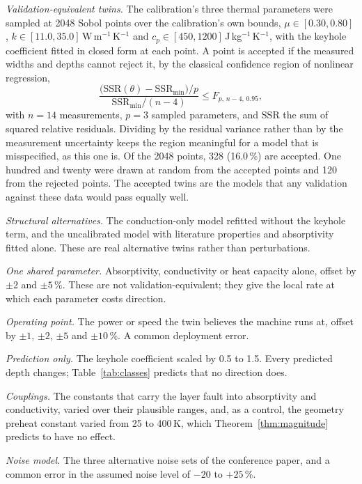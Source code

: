 \documentclass[preprint,12pt]{elsarticle}
\begin{document}
\emph{Validation-equivalent twins.} The calibration's three thermal parameters
were sampled at 2048 Sobol points over the calibration's own bounds,
$\mu\in[0.30, 0.80]$, $k\in[11.0, 35.0]$\,W\,m$^{-1}$\,K$^{-1}$ and
$c_p\in[450, 1200]$\,J\,kg$^{-1}$\,K$^{-1}$, with the keyhole coefficient
fitted in closed form at each point. A point is accepted if the measured widths
and depths cannot reject it, by the classical confidence region of nonlinear
regression,
\begin{equation}
\frac{\bigl(\mathrm{SSR}(\theta) - \mathrm{SSR}_{\min}\bigr)/p}
     {\mathrm{SSR}_{\min}/(n - 4)} \le F_{p,\,n-4,\,0.95},
\label{eq:region}
\end{equation}
with $n = 14$ measurements, $p = 3$ sampled parameters, and $\mathrm{SSR}$ the
sum of squared relative residuals. Dividing by the residual variance rather
than by the measurement uncertainty keeps the region meaningful for a model
that is misspecified, as this one is. Of the 2048 points, 328 (16.0\,\%) are
accepted. One hundred and twenty were drawn at random from the accepted points
and 120 from the rejected points. The accepted twins are the models that any
validation against these data would pass equally well.

\emph{Structural alternatives.} The conduction-only model refitted without the
keyhole term, and the uncalibrated model with literature properties and
absorptivity fitted alone. These are real alternative twins rather than
perturbations.

\emph{One shared parameter.} Absorptivity, conductivity or heat capacity alone,
offset by $\pm2$ and $\pm5$\,\%. These are not validation-equivalent; they give
the local rate at which each parameter costs direction.

\emph{Operating point.} The power or speed the twin believes the machine runs
at, offset by $\pm1$, $\pm2$, $\pm5$ and $\pm10$\,\%. A common deployment error.

\emph{Prediction only.} The keyhole coefficient scaled by 0.5 to 1.5. Every
predicted depth changes; Table~\ref{tab:classes} predicts that no direction
does.

\emph{Couplings.} The constants that carry the layer fault into absorptivity and
conductivity, varied over their plausible ranges, and, as a control, the
geometry preheat constant varied from 25 to 400\,K, which
Theorem~\ref{thm:magnitude} predicts to have no effect.

\emph{Noise model.} The three alternative noise sets of the conference paper,
and a common error in the assumed noise level of $-20$ to $+25$\,\%.
\end{document}
